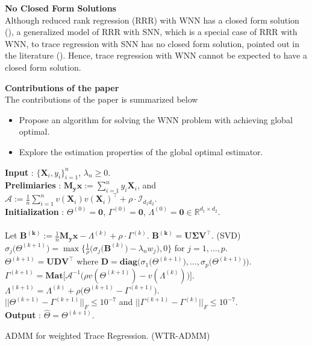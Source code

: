 \documentclass[12pt]{article}
\begin{document}
{\bf No Closed Form Solutions}\\
Although reduced rank regression (RRR) with WNN has a closed form solution (\citep{chen2013reduced}), a generalized model of RRR with SNN, which is a special case of RRR with WNN, to trace regression with SNN has no closed form solution, pointed out in the literature (\citep{negahban2011estimation, koltchinskii2011nuclear}). Hence,  trace regression with WNN cannot be expected to have a closed form solution.


{\bf Contributions of the paper}\\
The contributions of the paper is summarized below
\begin{itemize}
    \item Propose an algorithm for solving the WNN problem with achieving global optimal.
    \item Explore the estimation properties of the global optimal estimator.
\end{itemize}






\newpage
\begin{algorithm}[h] \label{alg:1}
    \textbf{Input} : $\big\{\mathbf{X}_{i},y_{i}\big\}_{i=1}^{n}$, $\lambda_{n} \geq 0$. \\
    \textbf{Prelimiaries} : $\mathbf{M_{y}x}:=\sum_{i=1}^{n}y_{i}\mathbf{X}_{i}$, and
    $\mathcal{A} := \frac{1}{n}\sum_{i=1}^{n} v(\mathbf{X}_{i})v(\mathbf{X}_{i})^{\top}+\rho\cdot\mathcal{I}_{d_1d_2}$. \\
    \textbf{Initialization} : $\Theta^{(0)}=\mathbf{0}$, $\Gamma^{(0)}=\mathbf{0}$, $\Lambda^{(0)}=\mathbf{0} \in\mathbb{R}^{d_{1}\times d_{2}}$. \\
     \\
    \qquad {} Let $\mathbf{B^{(k)}}:=\frac{1}{n}\mathbf{M_{y}x}-\Lambda^{(k)}+\rho \cdot \Gamma^{(k)}$. \quad $\mathbf{B^{(k)}}=\mathbf{U}\boldsymbol{\Sigma}\mathbf{V^{\top}}$. (SVD) \\
    \qquad \qquad \qquad \qquad $\sigma_{j}\big(\Theta^{(k+1)}\big)=\max\bigg\{\frac{1}{\rho}\big(\sigma_{j}(\mathbf{B}^{(k)}\big)-\lambda_{n} w_{j}\big),0 \bigg\}$ for $j=1,\dots,p$. \\
    \qquad \qquad \qquad \qquad $\Theta^{(k+1)} = \mathbf{UDV^{\top}}$ where $\mathbf{D}=\textbf{diag}\big( \sigma_{1}\big(\Theta^{(k+1)}\big),\dots,\sigma_{p}\big(\Theta^{(k+1)}\big) \big)$.  \\
    \qquad {} 
    $\Gamma^{(k+1)} = \textbf{Mat} \big[\mathcal{A}^{-1}\big(\rho v(\Theta^{(k+1)})-v(\Lambda^{(k)})\big)\big].$\\
    \qquad {} $\Lambda^{(k+1)} = \Lambda^{(k)} + \rho\big( \Theta^{(k+1)}-\Gamma^{(k+1)} \big)$.\\
     $|| \Theta^{(k+1)}-\Gamma^{(k+1)} ||_{F}\leq 10^{-7}$ and $|| \Gamma^{(k+1)}-\Gamma^{(k)} ||_{F}\leq 10^{-7}$. \\
    \textbf{Output} : $\widehat{\Theta}=\Theta^{(k+1)}$. 
\caption{ADMM for weighted Trace Regression. (WTR-ADMM)}
\end{algorithm}
\end{document}
